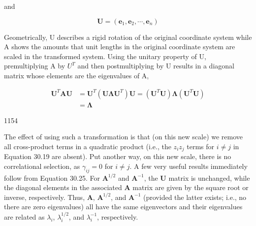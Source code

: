 \documentclass{article}
\begin{document}
and

\begin{equation}
\mathbf{U}=\left(\mathbf{e}_{1},\mathbf{e}_{2},\cdots,\mathbf{e}_{n}\right)
\tag{30.24b}
\label{eq:30_24b}
\end{equation}

Geometrically, U describes a rigid rotation of the original coordinate system while A shows the amounts that unit lengths in the original coordinate system are scaled in the transformed system. Using the unitary property of U, premultiplying A by  $ U^{T} $ and then postmultiplying by U results in a diagonal matrix whose elements are the eigenvalues of A,

\begin{equation}
\begin{aligned}\mathbf{U}^{T}\mathbf{A}\mathbf{U}&=\mathbf{U}^{T}(\mathbf{U}\boldsymbol{\Lambda}\mathbf{U}^{T})\mathbf{U}=(\mathbf{U}^{T}\mathbf{U})\boldsymbol{\Lambda}(\mathbf{U}^{T}\mathbf{U})\\&=\boldsymbol{\Lambda}\end{aligned}
\tag{30.25}
\label{eq:30_25}
\end{equation}

1154

The effect of using such a transformation is that (on this new scale) we remove all cross-product terms in a quadratic product (i.e., the  $ z_i z_j $ terms for  $ i \neq j $ in Equation 30.19 are absent). Put another way, on this new scale, there is no correlational selection, as  $ \gamma_{ij} = 0 $ for  $ i \neq j $. A few very useful results immediately follow from Equation 30.25. For  $ \mathbf{A}^{1/2} $ and  $ \mathbf{A}^{-1} $, the  $ \mathbf{U} $ matrix is unchanged, while the diagonal elements in the associated  $ \mathbf{A} $ matrix are given by the square root or inverse, respectively. Thus,  $ \mathbf{A} $,  $ \mathbf{A}^{1/2} $, and  $ \mathbf{A}^{-1} $ (provided the latter exists; i.e., no there are zero eigenvalues) all have the same eigenvectors and their eigenvalues are related as  $ \lambda_i $,  $ \lambda_i^{1/2} $, and  $ \lambda_i^{-1} $, respectively.
\end{document}
